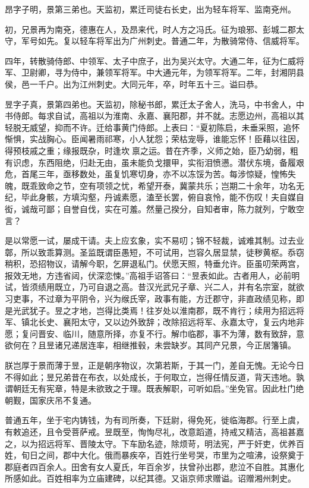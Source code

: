 \documentclass[12pt,UTF8]{ctexbook}
\begin{document}
昂字子明，景第三弟也。天监初，累迁司徒右长史，出为轻车将军、监南兗州。

初，兄景再为南兗，德惠在人，及昂来代，时人方之冯氏。征为琅邪、彭城二郡太守，军号如先。复以轻车将军出为广州刺史。普通二年，为散骑常侍、信威将军。

四年，转散骑侍郎、中领军、太子中庶子，出为吴兴太守。大通二年，征为仁威将军、卫尉卿，寻为侍中，兼领军将军。中大通元年，为领军将军。二年，封湘阴县侯，邑一千户。出为江州刺史。大同元年，卒，时年五十三。谥曰恭。

昱字子真，景第四弟也。天监初，除秘书郎，累迁太子舍人，洗马，中书舍人，中书侍郎。每求自试，高祖以为淮南、永嘉、襄阳郡，并不就。志愿边州，高祖以其轻脱无威望，抑而不许。迁给事黄门侍郎。上表曰：“夏初陈启，未垂采照，追怀惭惧，实战胸心。臣闻暑雨祁寒，小人犹怨；荣枯宠辱，谁能忘怀！臣藉以往因，得预枝戚之重；缘报既杂，时逢坎禀之运。昔在齐季，义师之始，臣乃幼弱，粗有识虑，东西阻绝，归赴无由，虽未能负戈擐甲，实衔泪愤懑。潜伏东境，备履艰危，首尾三年，亟移数处，虽复饥寒切身，亦不以冻馁为苦。每涉惊疑，惶怖失魄，既乖致命之节，空有项领之忧，希望开泰，冀蒙共乐；岂期二十余年，功名无纪，毕此身骸，方填沟壑，丹诚素愿，溘至长罢，俯自哀怜，能不伤叹！夫自媒自衒，诚哉可鄙；自誉自伐，实在可羞。然量己揆分，自知者审，陈力就列，宁敢空言？

是以常愿一试，屡成干请。夫上应玄象，实不易叨；锦不轻裁，诚难其制。过去业鄣，所以致乖算测。圣监既谓臣愚短，不可试用，岂容久居显禁，徒秽黄枢。忝窃稍积，恐招物议，请解今职，乞屏退私门。伏愿天照，特垂允许。臣虽叨荣两宫，报效无地，方违省闼，伏深恋悚。”高祖手诏答曰：“昱表如此。古者用人，必前明试，皆须绩用既立，乃可自退之高。昔汉光武兄子章、兴二人，并有名宗室，就欲习吏事，不过章为平阴令，兴为缑氏宰，政事有能，方迁郡守，非直政绩见称，即是光武犹子。昱之才地，岂得比类焉！往岁处以淮南郡，既不肯行；续用为招远将军、镇北长史、襄阳太守，又以边外致辞；改除招远将军、永嘉太守，复云内地非愿；复问晋安、临川，随意所择，亦复不行。解巾临郡，事不为薄，数有致辞，意欲何在？且昱诸兄递居连率，相继推毂，未尝缺岁。其同产兄景，今正居籓镇。

朕岂厚于景而薄于昱，正是朝序物议，次第若斯，于其一门，差自无愧。无论今日不得如此；昱兄弟昔在布衣，以处成长，于何取立，岂得任情反道，背天违地。孰谓朝廷无有宪章，特是未欲致之于理。既表解职，可听如启。”坐免官。因此杜门绝朝觐，国家庆吊不复通。

普通五年，坐于宅内铸钱，为有司所奏，下廷尉，得免死，徙临海郡。行至上虞，有敕追还，且令受菩萨戒。昱既至，恂恂尽礼，改意蹈道，持戒又精洁，高祖甚嘉之，以为招远将军、晋陵太守。下车励名迹，除烦苛，明法宪，严于奸吏，优养百姓，旬日之间，郡中大化。俄而暴疾卒，百姓行坐号哭，市里为之喧沸，设祭奠于郡庭者四百余人。田舍有女人夏氏，年百余岁，扶曾孙出郡，悲泣不自胜。其惠化所感如此。百姓相率为立庙建碑，以纪其德。又诣京师求赠谥。诏赠湘州刺史。
\end{document}
